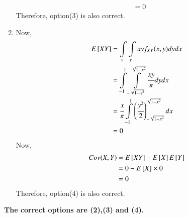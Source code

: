 \documentclass[journal,12pt,twocolumn]{IEEEtran}
\begin{document}
\begin{enumerate}
\begin{align}
    &=0
\end{align}
Therefore, option(3) is also correct.\\
\item
Now,
\begin{align}
    E{}\left[XY\right]&=\displaystyle\int\limits_{x}\displaystyle\int\limits_{y}xyf_{XY}(x,y)dydx\\
    &=\displaystyle\int\limits_{-1}^{1}\displaystyle\int\limits_{-\sqrt{1-x^2}}^{\sqrt{1-x^2}}\cfrac{xy}{\pi}dydx\\
    &=\cfrac{x}{\pi} \displaystyle\int\limits_{-1}^{1}\left(\cfrac{y^2}{2}\right)_{-\sqrt{1-x^2}}^{\sqrt{1-x^2}}dx\\
    &=0
\end{align}
Now,
\begin{align}
    Cov(X,Y)&=E{}\left[XY\right]-E{}\left[X\right]E{}\left[Y\right]\\
    &=0-E{}\left[X\right]\times0\\
    &=0
\end{align}
Therefore, option(4) is also correct.\\
\end{enumerate}
\textbf{The correct options are (2),(3) and (4).}
\end{document}
